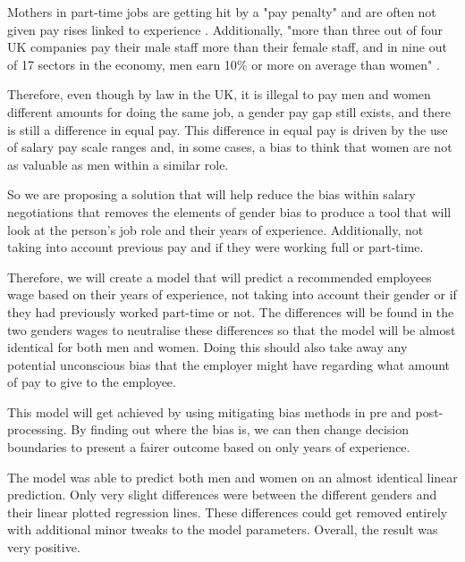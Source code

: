 \documentclass{sigchi}
\begin{document}
	Mothers in part-time jobs are getting hit by a "pay penalty" and are often not given pay rises linked to experience \cite{bbc_mothers_suffering}. Additionally, "more than three out of four UK companies pay their male staff more than their female staff, and in nine out of 17 sectors in the economy, men earn 10\% or more on average than women" \cite{gender_pay_FT}.%

	Therefore, even though by law in the UK, it is illegal to pay men and women different amounts for doing the same job, a gender pay gap still exists, and there is still a difference in equal pay. This difference in equal pay is driven by the use of salary pay scale ranges and, in some cases, a bias to think that women are not as valuable as men within a similar role.
	
	So we are proposing a solution that will help reduce the bias within salary negotiations that removes the elements of gender bias to produce a tool that will look at the person's job role and their years of experience. Additionally, not taking into account previous pay and if they were working full or part-time.

	Therefore, we will create a model that will predict a recommended employees wage based on their years of experience, not taking into account their gender or if they had previously worked part-time or not. The differences will be found in the two genders wages to neutralise these differences so that the model will be almost identical for both men and women. Doing this should also take away any potential unconscious bias that the employer might have regarding what amount of pay to give to the employee.
	
	This model will get achieved by using mitigating bias methods in pre and post-processing. By finding out where the bias is, we can then change decision boundaries to present a fairer outcome based on only years of experience.

	The model was able to predict both men and women on an almost identical linear prediction. Only very slight differences were between the different genders and their linear plotted regression lines. These differences could get removed entirely with additional minor tweaks to the model parameters. Overall, the result was very positive.
\end{document}
